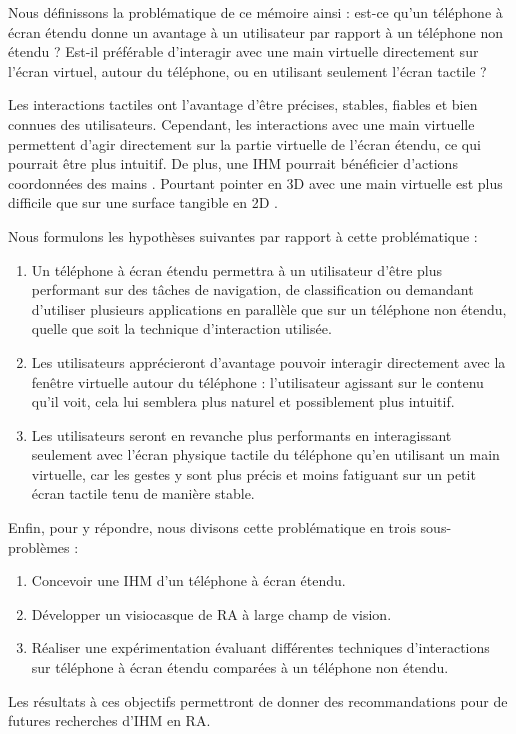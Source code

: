 Nous définissons la problématique de ce mémoire ainsi : est-ce qu'un téléphone à écran étendu donne un avantage à un utilisateur par rapport à un téléphone non étendu ? Est-il préférable d'interagir avec une main virtuelle directement sur l'écran virtuel, autour du téléphone, ou en utilisant seulement l'écran tactile ?

Les interactions tactiles ont l'avantage d'être précises, stables, fiables et bien connues des utilisateurs. Cependant, les interactions avec une main virtuelle permettent d'agir directement sur la partie virtuelle de l'écran étendu, ce qui pourrait être plus intuitif. De plus, une IHM pourrait bénéficier d'actions coordonnées des mains \citep{White2009}. Pourtant pointer en 3D avec une main virtuelle est plus difficile que sur une surface tangible en 2D \citep{Argelaguet2013}.

Nous formulons les hypothèses suivantes par rapport à cette problématique :
\begin{enumerate}[label={(H\arabic*)}]
  \item Un téléphone à écran étendu permettra à un utilisateur d'être plus performant sur des tâches de navigation, de classification ou demandant d'utiliser plusieurs applications en parallèle que sur un téléphone non étendu, quelle que soit la technique d'interaction utilisée.
  \item Les utilisateurs apprécieront d'avantage pouvoir interagir directement avec la fenêtre virtuelle autour du téléphone : l'utilisateur agissant sur le contenu qu'il voit, cela lui semblera plus naturel et possiblement plus intuitif.
  \item Les utilisateurs seront en revanche plus performants en interagissant seulement avec l'écran physique tactile du téléphone qu'en utilisant un main virtuelle, car les gestes y sont plus précis et moins fatiguant sur un petit écran tactile tenu de manière stable.
\end{enumerate}
\medskip
 
Enfin, pour y répondre, nous divisons cette problématique en trois sous-problèmes :
\begin{enumerate}
  \item Concevoir une IHM d'un téléphone à écran étendu.
  \item Développer un visiocasque de RA à large champ de vision.
  \item Réaliser une expérimentation évaluant différentes techniques d'interactions sur téléphone à écran étendu comparées à un téléphone non étendu.
\end{enumerate}
\medskip

Les résultats à ces objectifs permettront de donner des recommandations pour de futures recherches d'IHM en RA.